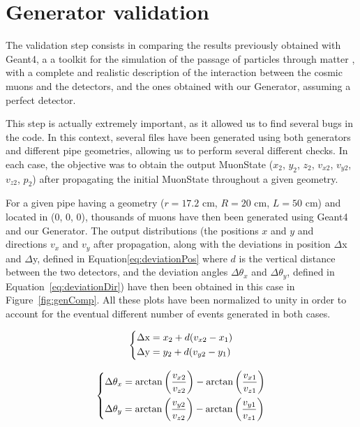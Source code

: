 \documentclass[a4paper, 11pt]{report}
\begin{document}
\section{Generator validation} \label{sec:validation}

The validation step consists in comparing the results previously obtained with Geant4, a a toolkit for the simulation of the passage of particles through matter \cite{Geant4}, with a complete and realistic description of the interaction between the cosmic muons and the detectors, and the ones obtained with our Generator, assuming a perfect detector.

This step is actually extremely important, as it allowed us to find several bugs in the code. In this context, several files have been generated using both generators and different pipe geometries, allowing us to perform several different checks. In each case, the objective was to obtain the output MuonState ($x_2$, $y_2$, $z_2$, $v_{x2}$, $v_{y2}$, $v_{z2}$, $p_2$) after propagating the initial MuonState throughout a given geometry.

For a given pipe having a geometry ($r = 17.2$ cm, $R = 20$ cm, $L = 50$ cm) and located in (0, 0, 0), thousands of muons have then been generated using Geant4 and our Generator. The output distributions (the positions $x$ and $y$ and directions $v_x$ and $v_y$ after propagation, along with the deviations in position $\Delta$x and $\Delta$y, defined in Equation\ref{eq:deviationPos} where $d$ is the vertical distance between the two detectors, and the deviation angles $\Delta \theta_x$ and $\Delta \theta_y$, defined in Equation~\ref{eq:deviationDir}) have then been obtained in this case in Figure~\ref{fig:genComp}. All these plots have been normalized to unity in order to account for the eventual different number of events generated in both cases.

\begin{equation}
\label{eq:deviationPos}
\begin{dcases}
\Delta \text{x} = x_2 + d (v_{x2} - x_1)  \\
\Delta \text{y} = y_2 + d (v_{y2} - y_1)
\end{dcases}
\end{equation}

\begin{equation}
\label{eq:deviationDir}
\begin{dcases}
\Delta \theta_x = \arctan \left ({\frac{v_{x2}}{v_{z2}}} \right ) - \arctan \left ({\frac{v_{x1}}{v_{z1}}} \right ) \\
\Delta \theta_y = \arctan \left ({\frac{v_{y2}}{v_{z2}}} \right ) - \arctan \left ({\frac{v_{y1}}{v_{z1}}} \right )
\end{dcases}
\end{equation}
\end{document}
